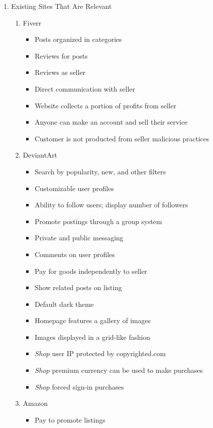 \documentclass[]{article}
\begin{document}
		\begin{enumerate}
			\item Existing Sites That Are Relevant
				\begin{enumerate}
					\item Fiverr
						\begin{itemize}
							\item Posts organized in categories
							\item Reviews for posts
							\item Reviews as seller
							\item Direct communication with seller
							\item Website collects a portion of profits from seller
							\item Anyone can make an account and sell their service
							\item Customer is not producted from seller malicious practices
						\end{itemize}
					\item DeviantArt
						\begin{itemize}
							\item Search by popularity, new, and other filters
							\item Customizable user profiles
							\item Ability to follow users; display number of followers
							\item Promote postings through a group system
							\item Private and public messaging
							\item Comments on user profiles
							\item Pay for goods independently to seller
							\item Show related posts on listing
							\item Default dark theme
							\item Homepage features a gallery of images
							\item Images displayed in a grid-like fashion
							\item \(Shop\) user IP protected by copyrighted.com
							\item \(Shop\) premium currency can be used to make purchases
							\item \(Shop\) forced sign-in purchases
						\end{itemize}
					\item Amazon
						\begin{itemize}
							\item Pay to promote listings

\end{itemize}
\end{enumerate}
\end{enumerate}
\end{document}
